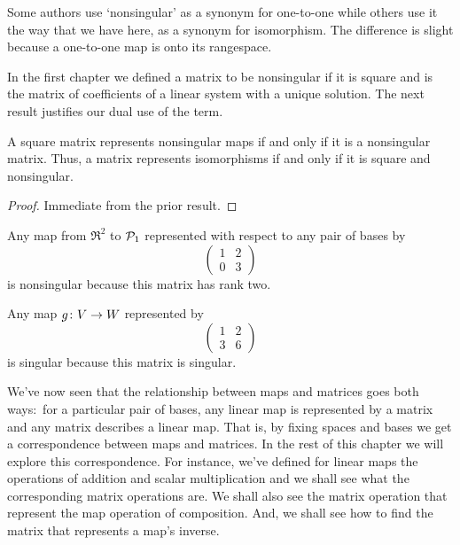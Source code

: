 \begin{remark}
Some authors use `nonsingular' as a synonym for one-to-one  
while others use it the way that we have here, as a synonym for
isomorphism.
The difference is slight because a one-to-one map is onto its
rangespace.
\end{remark}

In the first chapter we defined a matrix to be nonsingular 
if it is square and is
the matrix of coefficients of a linear system with a unique solution.
The next result justifies our dual use of the term.

\begin{corollary} \label{cor:NonsingMatIffNonsingMap}
A square matrix represents nonsingular maps if and only if it is a nonsingular
matrix.
Thus, a matrix represents isomorphisms if and only if it is square and
nonsingular. 
\end{corollary}

\begin{proof}
Immediate from the prior result.
\end{proof}

\begin{example}
Any map from \( \Re^2 \) to \( \mathcal{P}_1 \) represented 
with respect to any pair of bases by
\begin{equation*}
  \begin{pmatrix}
     1  &2  \\
     0  &3  
  \end{pmatrix}
\end{equation*}
is nonsingular because this matrix has rank two.
\end{example}

\begin{example} \label{ex:NonSMatHasNonSMap}
Any map \( \mbox{$g\colon V\to W$} \) represented by
\begin{equation*}
  \begin{pmatrix}
    1  &2  \\
    3  &6
  \end{pmatrix}
\end{equation*}
is singular because this matrix is singular.
\end{example}

We've now seen that the relationship between maps and 
matrices goes both ways:~for a particular pair of bases, 
any linear map is represented by a
matrix and any matrix describes a linear map.
That is, by fixing spaces and bases we get
a correspondence between maps and matrices.
In the rest of this chapter we will explore this correspondence.
For instance, we've defined for linear maps the operations of addition 
and scalar multiplication and we shall see what the corresponding matrix 
operations are.
We shall also see the matrix operation that represent the map operation
of composition.
And, we shall see how to find the matrix that represents a map's inverse.


